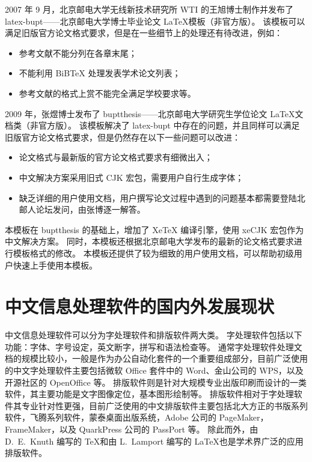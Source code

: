 2007 年 9 月，北京邮电大学无线新技术研究所 \gls*{WTI} 的王旭博士制作并发布了 latex-bupt——北京邮电大学博士毕业论文 \LaTeX 模板（非官方版）\cite{latex-bupt}。
该模板可以满足旧版官方论文格式要求\cite{BUPT_Thesis_Format_2004}，但是在一些细节上的处理还有待改进，例如：
\begin{itemize}
\item 参考文献不能分列在各章末尾；
\item 不能利用 BiBTeX 处理发表学术论文列表；
\item 参考文献的格式上赏不能完全满足学校要求等。
\end{itemize}

2009 年，张煜博士发布了 buptthesis——北京邮电大学研究生学位论文 \LaTeX 文档类（非官方版）\cite{buptthesis}。
该模板解决了 latex-bupt 中存在的问题，并且同样可以满足旧版官方论文格式要求\cite{BUPT_Thesis_Format_2004}，但是仍然存在以下一些问题可以改进：
\begin{itemize}
\item 论文格式与最新版的官方论文格式要求\cite{BUPT_Thesis_Format_2014}有细微出入；
\item 中文解决方案采用旧式 CJK 宏包，需要用户自行生成字体；
\item 缺乏详细的用户使用文档，用户撰写论文过程中遇到的问题基本都需要登陆北邮人论坛发问，由张博逐一解答。
\end{itemize}

本模板在 buptthesis\cite{buptthesis} 的基础上，增加了 XeTeX 编译引擎，使用 xeCJK 宏包作为中文解决方案。
同时，本模板还根据北京邮电大学发布的最新的论文格式要求进行模板格式的修改。
本模板还提供了较为细致的用户使用文档，可以帮助初级用户快速上手使用本模板。

\section{中文信息处理软件的国内外发展现状}
中文信息处理软件可以分为字处理软件和排版软件两大类。
字处理软件包括以下功能：字体、字号设定，英文断字，拼写和语法检查等。
通常字处理软件处理文档的规模比较小，一般是作为办公自动化套件的一个重要组成部分，目前广泛使用的中文字处理软件主要包括微软 Office 套件中的 Word、金山公司的 WPS，以及开源社区的 OpenOffice 等。
排版软件则是针对大规模专业出版印刷而设计的一类软件，其主要功能是文字图像定位，基本图形绘制等。
排版软件相对于字处理软件其专业针对性更强，目前广泛使用的中文排版软件主要包括北大方正的书版系列软件，飞腾系列软件，蒙泰桌面出版系统，Adobe 公司的 PageMaker，FrameMaker，以及 QuarkPress 公司的 PassPort 等。
除此而外，由 D.~E.~Knuth 编写的 \TeX 和由 L.~Lamport 编写的 \LaTeX 也是学术界广泛的应用排版软件。

